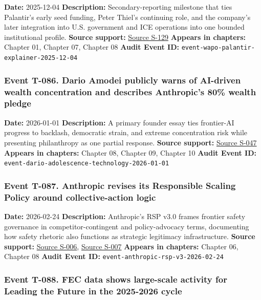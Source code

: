 \documentclass[
  american,
  11pt,
  letterpaper,
]{article}
\begin{document}
\textbf{Date:} 2025-12-04 \textbf{Description:} Secondary-reporting
milestone that ties Palantir's early seed funding, Peter Thiel's
continuing role, and the company's later integration into U.S.
government and ICE operations into one bounded institutional profile.
\textbf{Source support:}
\hyperref[source-s-129-what-to-know-about-palantir-the-tech-company-playing-a-key-role-for-ice]{Source
S-129} \textbf{Appears in chapters:} Chapter 01, Chapter 07, Chapter 08
\textbf{Audit Event ID:}
\texttt{event-wapo-palantir-explainer-2025-12-04}

\subsubsection{Event T-086. Dario Amodei publicly warns of AI-driven
wealth concentration and describes Anthropic's 80\% wealth
pledge}\label{event-t-086-dario-amodei-publicly-warns-of-ai-driven-wealth-concentration-and-describes-anthropic-s-80-wealth-pledge}

\textbf{Date:} 2026-01-01 \textbf{Description:} A primary founder essay
ties frontier-AI progress to backlash, democratic strain, and extreme
concentration risk while presenting philanthropy as one partial
response. \textbf{Source support:}
\hyperref[source-s-047-the-adolescence-of-technology]{Source S-047}
\textbf{Appears in chapters:} Chapter 08, Chapter 09, Chapter 10
\textbf{Audit Event ID:}
\texttt{event-dario-adolescence-technology-2026-01-01}

\subsubsection{Event T-087. Anthropic revises its Responsible Scaling
Policy around collective-action
logic}\label{event-t-087-anthropic-revises-its-responsible-scaling-policy-around-collective-action-logic}

\textbf{Date:} 2026-02-24 \textbf{Description:} Anthropic's RSP v3.0
frames frontier safety governance in competitor-contingent and
policy-advocacy terms, documenting how safety rhetoric also functions as
strategic legitimacy infrastructure. \textbf{Source support:}
\hyperref[source-s-006-anthropics-responsible-scaling-policy-version-30]{Source
S-006},
\hyperref[source-s-007-responsible-scaling-policy-version-3-0]{Source
S-007} \textbf{Appears in chapters:} Chapter 06, Chapter 08
\textbf{Audit Event ID:} \texttt{event-anthropic-rsp-v3-2026-02-24}

\subsubsection{Event T-088. FEC data shows large-scale activity for
Leading the Future in the 2025-2026
cycle}\label{event-t-088-fec-data-shows-large-scale-activity-for-leading-the-future-in-the-2025-2026-cycle}
\end{document}
